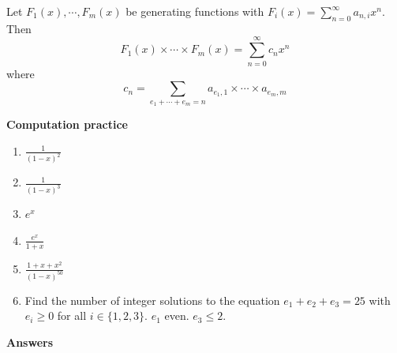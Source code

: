 \begin{theorem}
    Let $F_1(x), \cdots ,F_m(x)$ be generating functions with $F_i(x)=\sum_{n=0}^{\infty}a_{n,i}x^n$. 
    Then $$F_1(x) \times \cdots \times F_m(x)=\sum_{n=0}^{\infty}c_nx^n$$ 
    where $$c_n=\sum_{e_1+ \cdots +e_m=n}a_{e_1,1}\times \cdots \times a_{e_m,m}$$
\end{theorem}

\noindent \textbf{Computation practice}
\begin{enumerate}
    \item $\frac{1}{(1-x)^2}$
    \item $\frac{1}{(1-x)^3}$
    \item $e^x$
    \item $\frac{e^x}{1+x}$
    \item $\frac{1+x+x^2}{(1-x)^{50}}$
    \item Find the number of integer solutions to the equation $e_1+e_2+e_3=25$ with $e_i \geq 0$ for all $i \in \{1,2,3\}$. $e_1$ even. $e_3 \leq 2$.
\end{enumerate}
\textbf{Answers}
